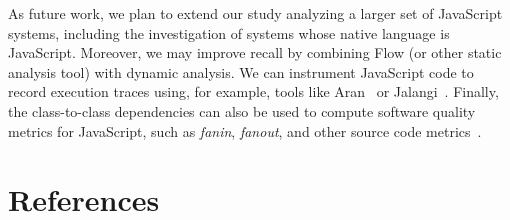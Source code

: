 \documentclass[review]{elsarticle}
\begin{document}
As future work, we plan to extend our study analyzing a larger set of JavaScript systems, including the investigation of systems whose native language is JavaScript. Moreover, we may improve recall by combining Flow (or other static analysis tool) with dynamic analysis. We can instrument JavaScript code to record execution traces using, for example, tools like Aran~\cite{aran-2015} or Jalangi~\cite{jalangi2013}. Finally, the class-to-class dependencies can also be used to compute software quality metrics for JavaScript, such as \textit{fanin}, \textit{fanout}, and other source code metrics~\cite{CK_metrics}.



\section*{References}


\end{document}
